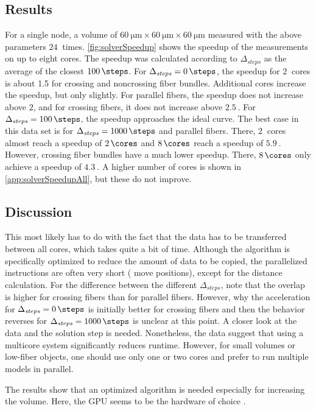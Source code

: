 \subsection{Results}
For a single node, a volume of $\SI{60}{\micro\meter} \times \SI{60}{\micro\meter} \times \SI{60}{\micro\meter}$ measured with the above parameters $\SI{24}{}$ times.
\cref{fig:solverSpeedup} shows the speedup of the measurements on up to eight cores.
The speedup was calculated according to $\Delta_{\mathit{steps}}$ as the average of the closest $\SI{100}{\steps}$.
For $\Delta_{\mathit{steps}} = \SI{0}{\steps}$, the speedup for $\SI{2}{}$ cores is about 1.5 for crossing and noncrossing fiber bundles.
Additional cores increase the speedup, but only slightly.
For parallel fibers, the speedup does not increase above $2$, and for crossing fibers, it does not increase above $\SI{2.5}{}$.
For $\Delta_{\mathit{steps}} = \SI{100}{\steps}$, the speedup approaches the ideal curve.
The best case in this data set is for $\Delta_{\mathit{steps}} = \SI{1000}{\steps}$ and parallel fibers.
There, $\SI{2}{}$ cores almost reach a speedup of $\SI{2}{\cores}$ and $\SI{8}{\cores}$ reach a speedup of $\SI{5.9}{}$.
However, crossing fiber bundles have a much lower speedup.
There, $\SI{8}{\cores}$ only achieve a speedup of $\SI{4.3}{}$.
A higher number of cores is shown in \cref{app:solverSpeedupAll}, but these do not improve.
% 
% 
% 
\subsection{Discussion}
This most likely has to do with the fact that the data has to be transferred between all cores, which takes quite a bit of time.
Although the algorithm is specifically optimized to reduce the amount of data to be copied, the parallelized instructions are often very short (\eg{} move positions), except for the distance calculation.
For the difference between the different $\Delta_{\mathit{steps}}$, note that the overlap is higher for crossing fibers than for parallel fibers.
However, why the acceleration for $\Delta_{\mathit{steps}}=\SI{0}{\steps}$ is initially better for crossing fibers and then the behavior reverses for $\Delta_{\mathit{steps}}=\SI{1000}{\steps}$ is unclear at this point.
A closer look at the data and the solution step is needed.
Nonetheless, the data suggest that using a multicore system significantly reduces runtime.
However, for small volumes or low-fiber objects, one should use only one or two cores and prefer to run multiple models in parallel.
\par
%
The results show that an optimized algorithm is needed especially for increasing the volume.
Here, the \ac{GPU} seems to be the hardware of choice \cite{Karras2012}.
%
%
%
